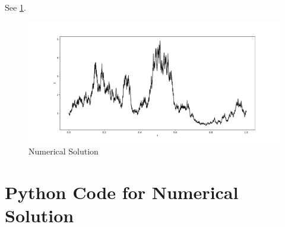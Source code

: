     See \cref{fig:numerical solution}.
    \begin{figure}[h]
        \centering
        \includegraphics[width=\linewidth]{solution}
        \caption{Numerical Solution}
        \label{fig:numerical solution}
    \end{figure}

    \appendix
    \section{Python Code for Numerical Solution}
    